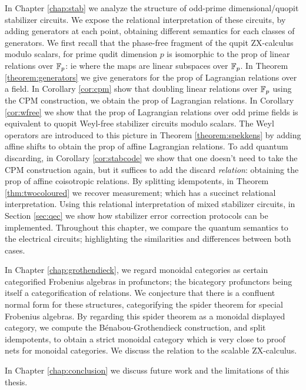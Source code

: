 In Chapter \ref{chap:stab}  we analyze the structure of odd-prime dimensional/quopit stabilizer circuits.
We expose the relational interpretation of these circuits, by adding generators at each point, obtaining different semantics for each classes of generators.  We first recall that the phase-free fragment of the qupit ZX-calculus modulo scalars, for prime qudit dimension $p$ is isomorphic to the prop of linear relations over $\mathbb{F}_p$: ie where the maps are linear subspaces over $\mathbb{F}_p$.
In Theorem \ref{theorem:generators} we give generators for the prop of Lagrangian relations over a field.
In Corollary \ref{cor:cpm} show that doubling  linear relations over $\mathbb{F}_p$ using the CPM construction, we obtain the prop of  Lagrangian relations. In Corollary \ref{cor:wfree} we  show that the prop of  Lagrangian relations over odd prime fields is equivalent to quopit Weyl-free stabilizer circuits modulo scalars. The Weyl operators are introduced to this picture in Theorem \ref{theorem:spekkens} by adding affine shifts to obtain the prop of affine Lagrangian relations. To add quantum discarding, in Corollary \ref{cor:stabcode} we show that one doesn't need to take the CPM construction again, but it suffices to add the discard {\em relation}:   obtaining the prop of affine coisotropic relations.  By splitting idempotents, in Theorem \ref{thm:twocoloured} we recover measurement; which has a succinct relational interpretation.  Using this relational interpretation of mixed stabilizer circuits, in Section \ref{sec:qec} we show how stabilizer error correction protocols can be implemented.  Throughout this chapter, we compare the quantum semantics to the electrical circuits; highlighting the similarities and differences between both cases.


In Chapter \ref{chap:grothendieck}, we regard monoidal categories as certain categorified Frobenius algebras in profunctors; the bicategory profunctors being itself a categorification of relations.  We conjecture that there is a confluent normal form for these structures, categorifying the spider theorem for special Frobenius algebras.  By regarding this spider theorem as a monoidal displayed category, we compute the B\'enabou-Grothendieck construction, and split idempotents, to obtain a strict monoidal category which is very close to proof nets for monoidal categories. We discuss the relation to the scalable ZX-calculus.

In Chapter \ref{chap:conclusion} we discuss future work and the limitations of this thesis.



